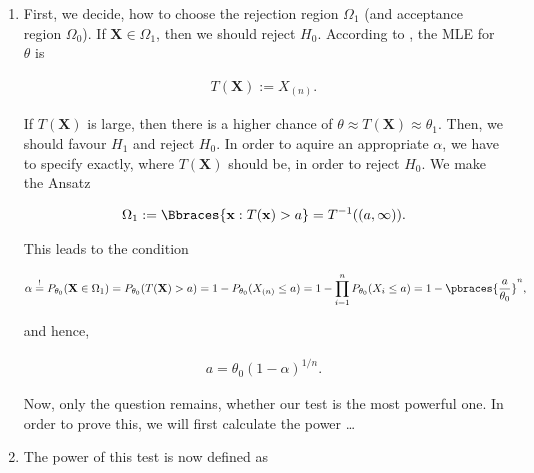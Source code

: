 \begin{solution}

\phantom{}

\begin{enumerate}[label = (\alph*)]

    \item First, we decide, how to choose the rejection region $\Omega_1$ (and acceptance region $\Omega_0$).
    If $\mathbf X \in \Omega_1$, then we should reject $H_0$.
    According to \cite[lecture 6, slide 69]{EStat}, the MLE for $\theta$ is

    \begin{align*}
        T(\mathbf X) := X_{(n)}.
    \end{align*}

    If $T(\mathbf X)$ is large, then there is a higher chance of $\theta \approx T(\mathbf X) \approx \theta_1$.
    Then, we should favour $H_1$ and reject $H_0$.
    In order to aquire an appropriate $\alpha$, we have to specify exactly, where $T(\mathbf X)$ should be, in order to reject $H_0$.
    We make the Ansatz

    \begin{align*}
        \Omega_1
        :=
        \Bbraces{\mathbf x: T(\mathbf x) > a}
        =
        T^{-1}((a, \infty)).
    \end{align*}

    This leads to the condition

    \begin{align*}
        \alpha
        \stackrel{!}{=}
        P_{\theta_0}(\mathbf X \in \Omega_1)
        =
        P_{\theta_0}(T(\mathbf X) > a)
        =
        1 - P_{\theta_0}(X_{(n)} \leq a)
        =
        1 - \prod_{i=1}^n P_{\theta_0}(X_i \leq a)
        =
        1 - \pbraces{\frac{a}{\theta_0}}^n,
    \end{align*}

    and hence,

    \begin{align*}
        a = \theta_0 (1 - \alpha)^{1/n}.
    \end{align*}

    Now, only the question remains, whether our test is the most powerful one.
    In order to prove this, we will first calculate the power \dots

    \item The power of this test is now defined as


\end{enumerate}
\end{solution}
